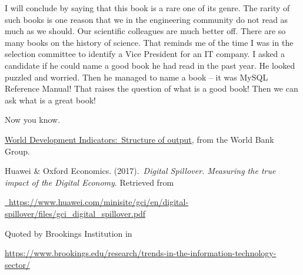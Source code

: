 \begin{multicols}{2}
I will conclude by saying that this book is a rare one of its genre. The rarity of such books is one reason that we in the engineering community do not read as much as we should. Our scientific colleagues are much better off. There are so many books on the history of science.  That reminds me of the time I was in the selection committee to identify a Vice President for an IT company. I asked a candidate if he could name a good book he had read in the past year. He looked puzzled and worried. Then he managed to name a book – it was MySQL Reference Manual! That raises the question of what is a good book! Then we can ask what is a great book!

Now you know. 

\begin{thebibliography}{99}

 \underline{World Development Indicators: Structure of output}, from the World Bank Group.

 Huawei \& Oxford Economics. (2017). \textit{Digital Spillover. Measuring the true impact of the Digital Economy}. Retrieved from

\url{ https://www.huawei.com/minisite/gci/en/digital-spillover/files/gci_digital_spillover.pdf}

Quoted by Brookings Institution in

\url{https://www.brookings.edu/research/trends-in-the-information-technology-sector/}

\end{thebibliography}


  
\end{multicols}



